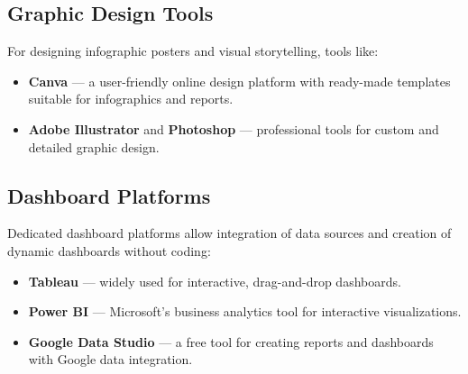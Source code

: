 \subsection*{Graphic Design Tools}

For designing infographic posters and visual storytelling, tools like:

\begin{itemize}
    \item \textbf{Canva} — a user-friendly online design platform with ready-made templates suitable for infographics and reports.
    \item \textbf{Adobe Illustrator} and \textbf{Photoshop} — professional tools for custom and detailed graphic design.
\end{itemize}

\subsection*{Dashboard Platforms}

Dedicated dashboard platforms allow integration of data sources and creation of dynamic dashboards without coding:

\begin{itemize}
    \item \textbf{Tableau} — widely used for interactive, drag-and-drop dashboards.
    \item \textbf{Power BI} — Microsoft’s business analytics tool for interactive visualizations.
    \item \textbf{Google Data Studio} — a free tool for creating reports and dashboards with Google data integration.
\end{itemize}




